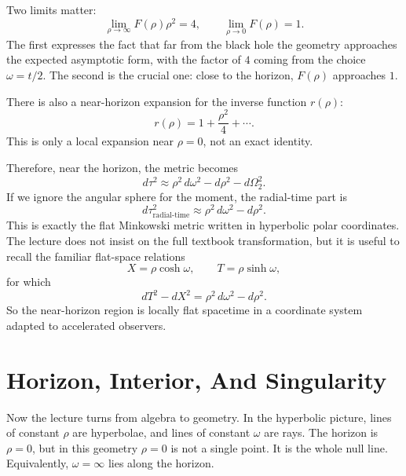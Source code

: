 Two limits matter:
\begin{equation}
\lim_{\rho\to\infty}F(\rho)\rho^2=4,
\qquad
\lim_{\rho\to 0}F(\rho)=1.
\end{equation}
The first expresses the fact that far from the black hole the geometry approaches the expected asymptotic form, with the factor of \(4\) coming from the choice \(\omega=t/2\). The second is the crucial one: close to the horizon, \(F(\rho)\) approaches \(1\).

There is also a near-horizon expansion for the inverse function \(r(\rho)\):
\begin{equation}
r(\rho)=1+\frac{\rho^2}{4}+\cdots.
\end{equation}
This is only a local expansion near \(\rho=0\), not an exact identity.

Therefore, near the horizon, the metric becomes
\begin{equation}
d\tau^2
\approx
\rho^2\,d\omega^2
-
d\rho^2
-
d\Omega_2^2.
\end{equation}
If we ignore the angular sphere for the moment, the radial-time part is
\begin{equation}
d\tau^2_{\text{radial-time}}
\approx
\rho^2\,d\omega^2-d\rho^2.
\end{equation}
This is exactly the flat Minkowski metric written in hyperbolic polar coordinates. The lecture does not insist on the full textbook transformation, but it is useful to recall the familiar flat-space relations
\begin{equation}
X=\rho\cosh\omega,
\qquad
T=\rho\sinh\omega,
\end{equation}
for which
\begin{equation}
dT^2-dX^2=\rho^2\,d\omega^2-d\rho^2.
\end{equation}
So the near-horizon region is locally flat spacetime in a coordinate system adapted to accelerated observers.

\section{Horizon, Interior, And Singularity}

Now the lecture turns from algebra to geometry. In the hyperbolic picture, lines of constant \(\rho\) are hyperbolae, and lines of constant \(\omega\) are rays. The horizon is \(\rho=0\), but in this geometry \(\rho=0\) is not a single point. It is the whole null line. Equivalently, \(\omega=\infty\) lies along the horizon.

